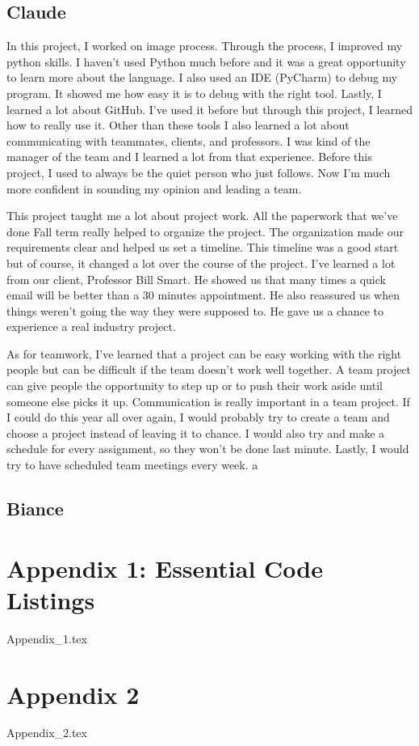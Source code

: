 \documentclass[onecolumn, draftclsnofoot,10pt, compsoc]{IEEEtran}
\begin{document}
	\subsection{Claude}
	In this project, I worked on image process. Through the process, I improved my python skills. I haven't used Python much before and it was a great opportunity to learn more about the language. I also used an IDE (PyCharm) to debug my program. It showed me how easy it is to debug with the right tool. Lastly, I learned a lot about GitHub. I've used it before but through this project, I learned how to really use it. Other than these tools I also learned a lot about communicating with teammates, clients, and professors. I was kind of the manager of the team and I learned a lot from that experience.  Before this project, I used to always be the quiet person who just follows. Now I'm much more confident in sounding my opinion and leading a team.  
	
	This project taught me a lot about project work. All the paperwork that we’ve done Fall term really helped to organize the project. The organization made our requirements clear and helped us set a timeline. This timeline was a good start but of course, it changed a lot over the course of the project. I’ve learned a lot from our client, Professor Bill Smart. He showed us that many times a quick email will be better than a 30 minutes appointment. He also reassured us when things weren’t going the way they were supposed to. He gave us a chance to experience a real industry project. 
	
	As for teamwork, I’ve learned that a project can be easy working with the right people but can be difficult if the team doesn’t work well together.  A team project can give people the opportunity to step up or to push their work aside until someone else picks it up. Communication is really important in a team project. If I could do this year all over again, I would probably try to create a team and choose a project instead of leaving it to chance. I would also try and make a schedule for every assignment, so they won’t be done last minute. Lastly, I would try to have scheduled team meetings every week. a
	
	
	\subsection{Biance}
	
	
	\section{Appendix 1: Essential Code Listings}
		{Appendix_1.tex}
	\newpage
	\section{Appendix 2}
		{Appendix_2.tex}
	\newpage
	
	
	
	
	
\end{document}
